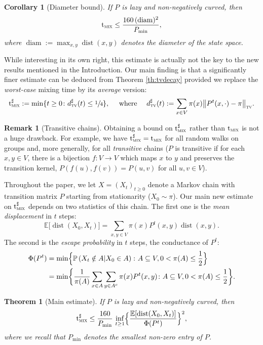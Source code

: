 \documentclass[10pt]{amsart}
\newtheorem{theorem}{Theorem}
\newtheorem{corollary}{Corollary}
\theoremstyle{definition}
\newtheorem{remark}{Remark}
\newcommand{\EE}{{\mathbb{E}}}
\newcommand{\PP}{{\mathbb{P}}}
\newcommand{\dtv}{d_{\textup{\textsc{tv}}}}
\newcommand{\tv}{\textup{\textsc{tv}}}
\newcommand{\tmix}{\mathrm{t}_{\textup{\textsc{mix}}}}
\newcommand{\pmin}{P_{\mathrm{min}}}
\DeclareMathOperator{\diam}{diam}
\DeclareMathOperator{\dist}{dist}
\begin{document}
\begin{corollary}[Diameter bound]\label{co:diam}If $P$ is lazy and non-negatively curved, then
\begin{equation*}
\tmix \le \frac{160\,(\diam)^2}{\pmin},
\end{equation*}
where $\diam:=\max_{x,y}\dist(x,y)$ denotes the diameter of the state space.
\end{corollary}
While interesting in its own right, this estimate is actually not the key to the new results mentioned in the Introduction. Our main finding is that a significantly finer estimate can be deduced from Theorem \ref{th:tvdecay} provided we replace the \emph{worst-case} mixing time by its \emph{average} version:
\begin{equation*}
\tmix^{\sharp} := \min\{t \ge 0\colon \dtv^\sharp(t)\le \sfrac 14\},\quad\textrm{ where }\quad \dtv^\sharp(t):=\sum_{x\in V}\pi(x)\bigl\|P^t(x,\cdot)-\pi\bigr\|_{\tv}.
\end{equation*}
\begin{remark}[Transitive chains]Obtaining a bound on $\tmix^\sharp$ rather than $\tmix$ is not a huge drawback. For example, we have $\tmix^\sharp=\tmix$ for all random walks on groups and, more generally, for all \emph{transitive} chains ($P$ is transitive if for each $x,y \in V$, there is a bijection $f\colon V\to V$ which maps $x$ to $y$ and preserves the transition kernel, \ie $P(f(u),f(v))=P(u,v)$ for all $u,v \in V$).
\end{remark}
Throughout the paper, we let $X=(X_t)_{t\ge 0}$ denote a Markov chain with transition matrix $P$ starting from stationarity ($X_0\sim \pi$). Our main new estimate on $\tmix^\sharp$ depends on two statistics of this chain. The first one is the \emph{mean displacement} in $t$ steps: \begin{equation*}
\EE \bigl[\dist(X_0,X_t) \bigr] = \sum_{x,y\in V}\pi(x)P^t(x,y)\dist(x,y).
\end{equation*}
The second is the \emph{escape probability} in $t$ steps, \ie the conductance of $P^t$:
\begin{align*}
\Phi(P^t) & = \min\Bigl\{\PP\left(X_t\notin A|X_0\in A\right)\colon A\subseteq V,0<\pi(A)\le \frac 12 \Bigr\}\\
& = \min\biggl\{\frac{1}{\pi(A)}\sum_{x\in A}\sum_{y\in A^c}\pi(x)P^t(x,y)\colon A\subseteq V,0<\pi(A)\le \frac 12\biggr\}.
\end{align*}

\begin{theorem}[Main estimate]\label{th:main} If $P$ is lazy and non-negatively curved, then
\begin{equation}
\label{infimum}
\tmix^\sharp \le \frac{160}{\pmin}\,\inf_{t\ge 1} \Bigl\{\frac{\EE[\dist(X_0,X_t)]}{\Phi(P^t)} \Bigr\}^2,
\end{equation}
where we recall that $\pmin$ denotes the smallest non-zero entry of $P$.
\end{theorem}
\end{document}
